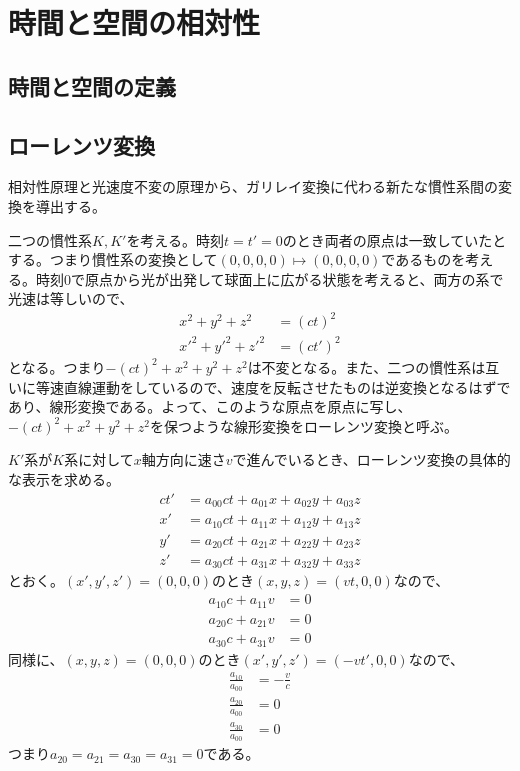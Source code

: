 \section{時間と空間の相対性}

\subsection{時間と空間の定義}

\subsection{ローレンツ変換}
    相対性原理と光速度不変の原理から、ガリレイ変換に代わる新たな慣性系間の変換を導出する。

    二つの慣性系$K, K'$を考える。時刻$t = t' = 0$のとき両者の原点は一致していたとする。つまり慣性系の変換として$(0, 0, 0, 0) \mapsto (0, 0, 0, 0)$であるものを考える。時刻0で原点から光が出発して球面上に広がる状態を考えると、両方の系で光速は等しいので、
    \begin{align*}
        x^2 + y^2 + z^2 &= (ct)^2\\
        x'^2 + y'^2 + z'^2 &= (ct')^2
    \end{align*}
    となる。つまり$-(ct)^2 + x^2 + y^2 + z^2$は不変となる。また、二つの慣性系は互いに等速直線運動をしているので、速度を反転させたものは逆変換となるはずであり、線形変換である。よって、このような原点を原点に写し、$-(ct)^2 + x^2 + y^2 + z^2$を保つような線形変換をローレンツ変換と呼ぶ。
    
    $K'$系が$K$系に対して$x$軸方向に速さ$v$で進んでいるとき、ローレンツ変換の具体的な表示を求める。
    \begin{align*}
        ct' &= a_{00}ct + a_{01}x + a_{02}y + a_{03}z\\
        x' &= a_{10}ct + a_{11}x + a_{12}y + a_{13}z\\
        y' &= a_{20}ct + a_{21}x + a_{22}y + a_{23}z\\
        z' &= a_{30}ct + a_{31}x + a_{32}y + a_{33}z
    \end{align*}
    とおく。$(x', y', z') = (0, 0, 0)$のとき$(x, y, z) = (vt, 0, 0)$なので、
    \begin{align*}
        a_{10}c + a_{11}v &= 0\\
        a_{20}c + a_{21}v &= 0\\
        a_{30}c + a_{31}v &= 0
    \end{align*}
    同様に、$(x, y, z) = (0, 0, 0)$のとき$(x', y', z') = (-vt', 0, 0)$なので、
    \begin{align*}
        \frac{a_{10}}{a_{00}} &= -\frac{v}{c}\\
        \frac{a_{20}}{a_{00}} &= 0\\
        \frac{a_{30}}{a_{00}} &= 0
    \end{align*}
    つまり$a_{20} = a_{21} = a_{30} = a_{31} = 0$である。
    
